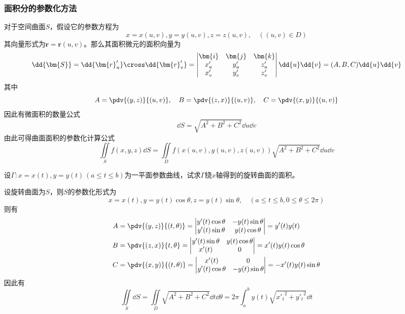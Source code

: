 \subsubsection{面积分的参数化方法}
对于空间曲面$S$，假设它的参数方程为
\[ x=x(u,v),y=y(u,v),z=z(u,v),\quad ((u,v)\in D) \]
其向量形式为$\bm{r}=\bm{r}(u,v)$。那么其面积微元的面积向量为
\[
    \dd{\bm{S}} = \dd{\bm{r}'_u} \cross \dd{\bm{r}'_v} =
    \begin{vmatrix}
        \bm{i} & \bm{j} & \bm{k} \\
        x'_u   & y'_u   & z'_u   \\
        x'_v   & y'_v   & z'_v
    \end{vmatrix}
    \dd{u}\dd{v}
    =(A,B,C)\dd{u}\dd{v}
\]
其中
\[
    A = \pdv{(y,z)}{(u,v)},\quad B=\pdv{(z,x)}{(u,v)},\quad C=\pdv{(x,y)}{(u,v)}
\]
因此有微面积的数量公式
\begin{equation}
    \dd{S} = \sqrt{A^2+B^2+C^2}\dd{u}\dd{v}
\end{equation}
由此可得曲面面积的参数化计算公式
\begin{equation}
    \iint\limits_S f(x,y,z)\dd{S} = \iint\limits_D f(x(u,v),y(u,v),z(u,v))\sqrt{A^2+B^2+C^2}\dd{u}\dd{v}
\end{equation}

\begin{example}
    设$\Gamma : x=x(t),y=y(t)\,(a\leq t \leq b)$为一平面参数曲线，试求$\Gamma$绕$x$轴得到的旋转曲面的面积。
\end{example}
\begin{solution}
    设旋转曲面为$S$，则$S$的参数化形式为
    \[ x = x(t), y = y(t)\cos\theta, z=y(t)\sin\theta,\quad (a\leq t \leq b, 0\leq \theta \leq 2\pi) \]
    则有
    \begin{align*}
        A & = \pdv{(y,z)}{(t,\theta)} =
        \begin{vmatrix}
            y'(t)\cos\theta & -y(t)\sin\theta \\
            y'(t)\sin\theta & y(t)\cos\theta
        \end{vmatrix}
        =y'(t)y(t)                      \\
        B & = \pdv{(z,x)}{t,\theta} =
        \begin{vmatrix}
            y'(t)\sin\theta & y(t)\cos\theta \\
            x'(t)           & 0
        \end{vmatrix}
        =x'(t)y(t)\cos\theta            \\
        C & = \pdv{(x,y)}{(t,\theta)} =
        \begin{vmatrix}
            x'(t)           & 0               \\
            y'(t)\cos\theta & -y(t)\sin\theta
        \end{vmatrix}
        = -x'(t)y(t)\sin\theta
    \end{align*}
    因此有
    \[
        \iint\limits_S \dd{S}
        =
        \iint\limits_D \sqrt{A^2+B^2+C^2}\dd{t}\dd{\theta}
        =
        2\pi\int_a^b y(t)\sqrt{{x'_t}^2+{y'_t}^2}\dd{t}
    \]
\end{solution}

